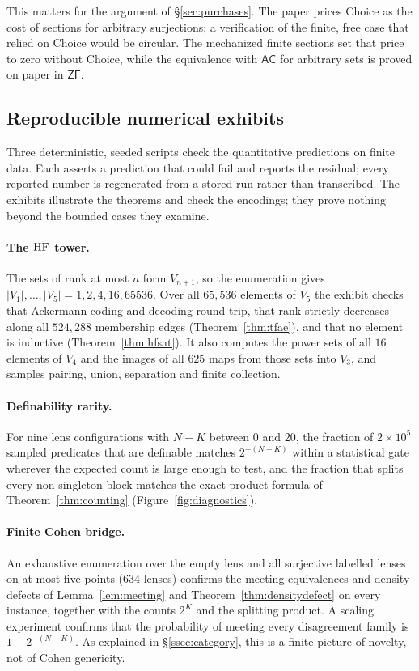This matters for the argument of \S\ref{sec:purchases}. The paper prices Choice as the cost of
sections for arbitrary surjections; a verification of the finite, free case that relied on Choice
would be circular. The mechanized finite sections set that price to zero without Choice, while the
equivalence with $\mathsf{AC}$ for arbitrary sets is proved on paper in $\mathsf{ZF}$.

\subsection{Reproducible numerical exhibits}

Three deterministic, seeded scripts check the quantitative predictions on finite data. Each
asserts a prediction that could fail and reports the residual; every reported number is
regenerated from a stored run rather than transcribed. The exhibits illustrate the theorems and
check the encodings; they prove nothing beyond the bounded cases they examine.

\paragraph{The $\mathrm{HF}$ tower.} The sets of rank at most $n$ form $V_{n+1}$, so the enumeration gives
$|V_1|,\dots,|V_5|=1,2,4,16,65536$. Over all $65{,}536$ elements of $V_5$ the exhibit checks
that Ackermann coding and decoding round-trip, that rank strictly decreases along all
$524{,}288$ membership edges (Theorem~\ref{thm:tfae}), and that no element is inductive
(Theorem~\ref{thm:hfsat}). It also computes the power sets of all $16$ elements of $V_4$ and the
images of all $625$ maps from those sets into $V_3$, and samples pairing, union, separation and
finite collection.

\paragraph{Definability rarity.} For nine lens configurations with $N-K$ between $0$ and $20$, the
fraction of $2\times10^5$ sampled predicates that are definable matches $2^{-(N-K)}$ within a
statistical gate wherever the expected count is large enough to test, and the fraction that
splits every non-singleton block matches the exact product formula of Theorem~\ref{thm:counting}
(Figure~\ref{fig:diagnostics}).

\paragraph{Finite Cohen bridge.} An exhaustive enumeration over the empty lens and all
surjective labelled lenses on at most five points ($634$ lenses) confirms the meeting equivalences
and density defects of Lemma~\ref{lem:meeting} and Theorem~\ref{thm:densitydefect} on every
instance, together with the counts $2^K$ and the splitting product. A scaling experiment confirms
that the probability of meeting every disagreement family is $1-2^{-(N-K)}$. As explained in
\S\ref{ssec:category}, this is a finite picture of novelty, not of Cohen genericity.


